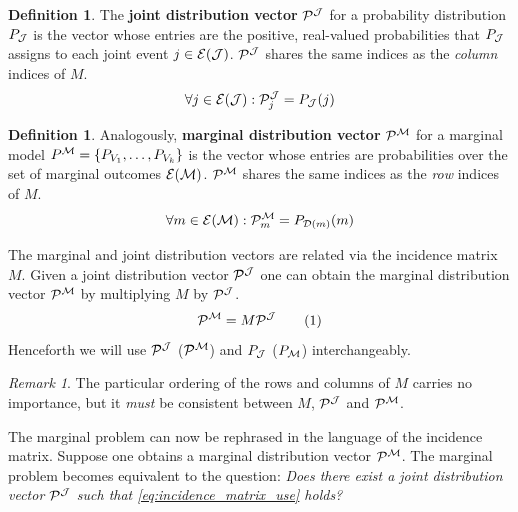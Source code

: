 \documentclass[aps, 10pt, english, twoside, pra, nofootinbib, longbibliography]{revtex4-1}
\theoremstyle{plain}
\theoremstyle{definition}
\newtheorem{definition}[theorem]{Definition}
\theoremstyle{remark}
\newtheorem{remark}[theorem]{Remark}
\newcommand{\mscenario}{\mathcal{M}}
\newcommand{\jointvar}{\mathcal{J}}
\newcommand{\term}[1]{\textcolor{Mahogany}{\textbf{#1}}}
\newcommand{\tcdot}{} %
\newcommand{\Events}[1]{\s{E}\br{#1}} %
\newcommand{\Dom}[1]{\s{D}\br{#1}} %
\begin{document}
    \begin{definition}
        The \term{joint distribution vector} $\probvec^{\jointvar}$ for a probability distribution $\prob[\jointvar]$ is the vector whose entries are the positive, real-valued probabilities that $\prob[\jointvar]$ assigns to each joint event $j \in \Events{\jointvar}$. $\probvec^{\jointvar}$ shares the same indices as the \textit{column} indices of $M$.
        \[ \forall j \in \Events{\jointvar} : \probvec^{\jointvar}_j = \prob[\jointvar][j] \]
    \end{definition}
    \begin{definition}
        Analogously, \term{marginal distribution vector} $\probvec^{\mscenario}$ for a marginal model $\prob^{\mscenario} = \bc{P_{V_1}, \ldots, P_{V_k}}$ is the vector whose entries are probabilities over the set of marginal outcomes $\Events{\mscenario}$. $\probvec^{\mscenario}$ shares the same indices as the \textit{row} indices of $M$.
        \[ \forall m \in \Events{\mscenario} : \probvec^{\mscenario}_m = \prob[\Dom{m}][m] \]
    \end{definition}
    The marginal and joint distribution vectors are related via the incidence matrix $M$. Given a joint distribution vector $\probvec^{\jointvar}$ one can obtain the marginal distribution vector $\probvec^{\mscenario}$ by multiplying $M$ by $\probvec^{\jointvar}$.
    \[ \probvec^{\mscenario} = M \tcdot \probvec^{\jointvar} \eq \label{eq:incidence_matrix_use} \]
    Henceforth we will use $\probvec^{\jointvar}$ ($\probvec^{\mscenario}$) and $\prob[\jointvar]$ ($\prob_{\mscenario}$) interchangeably.

    \begin{remark}
        The particular ordering of the rows and columns of $M$ carries no importance, but it \textit{must} be consistent between $M$, $\probvec^{\jointvar}$ and $\probvec^{\mscenario}$.
    \end{remark}

    The marginal problem can now be rephrased in the language of the incidence matrix. Suppose one obtains a marginal distribution vector $\probvec^{\mscenario}$. The marginal problem becomes equivalent to the question: \textit{Does there exist a joint distribution vector $\probvec^{\jointvar}$ such that \cref{eq:incidence_matrix_use} holds?}
\end{document}
